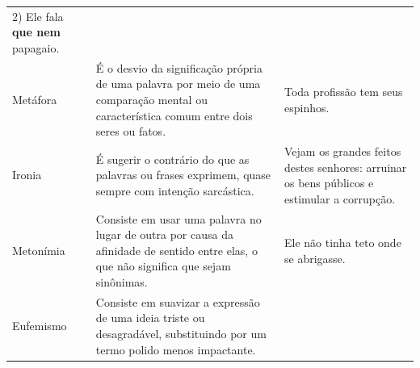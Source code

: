 \begin{longtable}[]{@{}lll@{}}
\begin{minipage}[t]{0.29\columnwidth}
2) Ele fala \textbf{que nem} papagaio.\strut
\end{minipage}\tabularnewline
\begin{minipage}[t]{0.29\columnwidth}\raggedright
Metáfora\strut
\end{minipage} & \begin{minipage}[t]{0.29\columnwidth}\raggedright
É o desvio da significação própria de uma palavra por meio de uma
comparação mental ou característica comum entre dois seres ou
fatos.\strut
\end{minipage} & \begin{minipage}[t]{0.29\columnwidth}\raggedright
Toda profissão tem seus espinhos.\strut
\end{minipage}\tabularnewline
\begin{minipage}[t]{0.29\columnwidth}\raggedright
Ironia\strut
\end{minipage} & \begin{minipage}[t]{0.29\columnwidth}\raggedright
É sugerir o contrário do que as palavras ou frases exprimem, quase
sempre com intenção sarcástica.\strut
\end{minipage} & \begin{minipage}[t]{0.29\columnwidth}\raggedright
Vejam os grandes feitos destes senhores: arruinar os bens públicos e
estimular a corrupção.\strut
\end{minipage}\tabularnewline
\begin{minipage}[t]{0.29\columnwidth}\raggedright
Metonímia\strut
\end{minipage} & \begin{minipage}[t]{0.29\columnwidth}\raggedright
Consiste em usar uma palavra no lugar de outra por causa da afinidade de
sentido entre elas, o que não significa que sejam sinônimas.\strut
\end{minipage} & \begin{minipage}[t]{0.29\columnwidth}\raggedright
Ele não tinha teto onde se abrigasse.\strut
\end{minipage}\tabularnewline
\begin{minipage}[t]{0.29\columnwidth}\raggedright
Eufemismo\strut
\end{minipage} & \begin{minipage}[t]{0.29\columnwidth}\raggedright
Consiste em suavizar a expressão de uma ideia triste ou desagradável,
substituindo por um termo polido menos impactante.\strut
\end{minipage} & \begin{minipage}[t]{0.29\columnwidth}\raggedright

\end{minipage}
\end{longtable}
